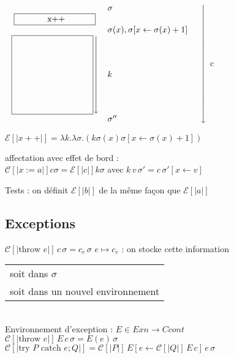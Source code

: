 \documentclass[10pt,a4paper]{article}
\newcommand{\E}{\mathcal{E}}
\newcommand{\semm}[1]{\left[| #1 | \right]}
\begin{document}
\begin{ex}
 
$\left.\begin{array}{c l l}
 & \sigma & \\
 \fbox{
 \begin{minipage}{3cm}
 \centering x++
 \end{minipage}} & \\
& \sigma(x), \sigma[x \leftarrow \sigma(x)+1] & \\
\left.\fbox{
 \begin{minipage}{3cm}
\vspace{3cm} \quad
 \end{minipage}}\right\downarrow &   k& \\
& \sigma'' & \\
\end{array}\right\downarrow$ c

$\E\semm{x++} = \lambda k. \lambda \sigma . (k \sigma(x) \sigma[x \leftarrow \sigma(x) +1])$

affectation avec effet de bord :\\
$\mathcal{C}\semm{x:=a} c \sigma = \E\semm{c} k \sigma$ avec $k \, v\,  \sigma' = c \, \sigma'[x \leftarrow v]$ 
\end{ex}

Tests : on définit $\E \semm{b}$ de la même façon que  $\E \semm{a}$

\subsection{Exceptions}

$\mathcal{C} \semm{\text{throw }e}\, c \,\sigma = c_e \,\sigma$ \qquad $e \mapsto c_e$ : on stocke cette information \begin{tabular}{l}
                                                                                                     soit dans $\sigma$\\
                                                                                                     soit dans un nouvel environnement
                                                                                                    \end{tabular}\\
Environnement d'exception : $E \in Exn → Ccont$\\
$\mathcal{C}  \semm{\text{throw }e}\, E \,c \,\sigma = E(e) \, \sigma$\\
$\mathcal{C}  \semm{\text{try $P$ catch $e;Q$}} = \mathcal{C}\semm{P} \,E[e ← \mathcal{C}\semm{Q}\, E \,c] \,e \,\sigma$
\end{document}
